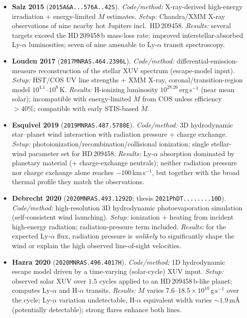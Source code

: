 \begin{itemize}
\item \textbf{Salz 2015} (\texttt{2015A\&A...576A..42S}).
\emph{Code/method:} X-ray-derived high-energy irradiation + energy-limited $\dot M$ estimates.
\emph{Setup:} Chandra/XMM X-ray observations of nine nearby hot Jupiters incl.\ HD\,209458.
\emph{Results:} several targets exceed the HD\,209458\,b mass-loss rate; improved interstellar-absorbed Ly-$\alpha$ luminosities; seven of nine amenable to Ly-$\alpha$ transit spectroscopy.

\item \textbf{Louden 2017} (\texttt{2017MNRAS.464.2396L}).
\emph{Code/method:} differential-emission-measure reconstruction of the stellar XUV spectrum (escape-model input).
\emph{Setup:} HST/COS UV line strengths + XMM X-ray, coronal/transition-region model $10^{4.1}$--$10^{8}$\,K.
\emph{Results:} H-ionizing luminosity $10^{28.26}$\,erg\,s$^{-1}$ (near mean solar); incompatible with energy-limited $\dot M$ from COS unless efficiency $>40\%$; compatible with early STIS-based $\dot M$.

\item \textbf{Esquivel 2019} (\texttt{2019MNRAS.487.5788E}).
\emph{Code/method:} 3D hydrodynamic star--planet wind interaction with radiation pressure + charge exchange.
\emph{Setup:} photoionization/recombination/collisional ionization; single stellar-wind parameter set for HD\,209458.
\emph{Results:} Ly-$\alpha$ absorption dominated by planetary material (+ charge-exchange neutrals); neither radiation pressure nor charge exchange alone reaches $-100$\,km\,s$^{-1}$, but together with the broad thermal profile they match the observations.

\item \textbf{Debrecht 2020} (\texttt{2020MNRAS.493.1292D}; thesis \texttt{2021PhDT........10D}).
\emph{Code/method:} high-resolution 3D hydrodynamic photoevaporation simulation (self-consistent wind launching).
\emph{Setup:} ionization + heating from incident high-energy radiation; radiation-pressure term included.
\emph{Results:} for the expected Ly-$\alpha$ flux, radiation pressure is \emph{unlikely} to significantly shape the wind or explain the high observed line-of-sight velocities.

\item \textbf{Hazra 2020} (\texttt{2020MNRAS.496.4017H}).
\emph{Code/method:} 1D hydrodynamic escape model driven by a time-varying (solar-cycle) XUV input.
\emph{Setup:} observed solar XUV over $1.5$ cycles applied to an HD\,209458\,b-like planet; computes Ly-$\alpha$ and H-$\alpha$ transits.
\emph{Results:} $\dot M$ varies $7.6$--$18.5\times10^{10}$\,g\,s$^{-1}$ over the cycle; Ly-$\alpha$ variation undetectable, H-$\alpha$ equivalent width varies $\sim1.9$\,m\AA{} (potentially detectable); strong flares enhance both lines.


\end{itemize}

